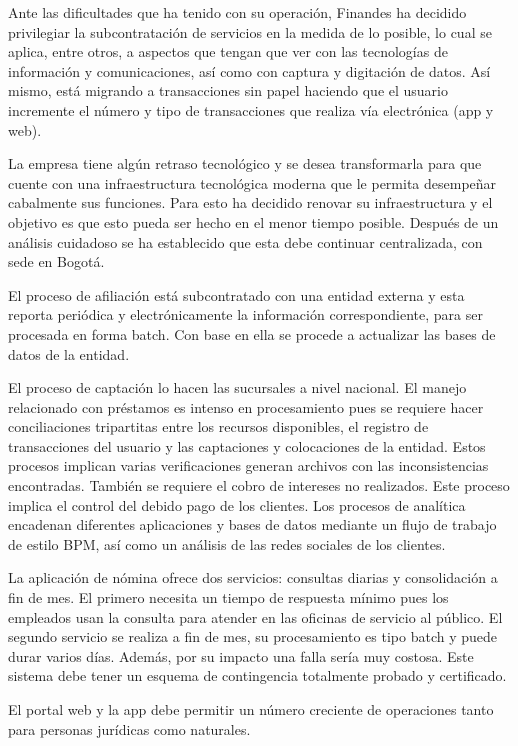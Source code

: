 \documentclass[a4paper]{article}
\begin{document}
Ante las dificultades que ha tenido con su operación, Finandes ha decidido privilegiar la subcontratación de servicios
en la medida de lo posible, lo cual se aplica, entre otros, a aspectos que tengan que ver con las tecnologías de
información y comunicaciones, así como con captura y digitación de datos. Así mismo, está migrando a
transacciones sin papel haciendo que el usuario incremente el número y tipo de transacciones que realiza vía
electrónica (app y web).

La empresa tiene algún retraso tecnológico y se desea transformarla para que cuente con una infraestructura
tecnológica moderna que le permita desempeñar cabalmente sus funciones. Para esto ha decidido renovar su
infraestructura y el objetivo es que esto pueda ser hecho en el menor tiempo posible. Después de un análisis
cuidadoso se ha establecido que esta debe continuar centralizada, con sede en Bogotá.

El proceso de afiliación está subcontratado con una entidad externa y esta reporta periódica y electrónicamente la
información correspondiente, para ser procesada en forma batch. Con base en ella se procede a actualizar las bases
de datos de la entidad.

El proceso de captación lo hacen las sucursales a nivel nacional. El manejo relacionado con préstamos es intenso en
procesamiento pues se requiere hacer conciliaciones tripartitas entre los recursos disponibles, el registro de
transacciones del usuario y las captaciones y colocaciones de la entidad. Estos procesos implican varias verificaciones generan archivos con las inconsistencias encontradas. También se requiere el cobro de intereses no
realizados. Este proceso implica el control del debido pago de los clientes.
Los procesos de analítica encadenan diferentes aplicaciones y bases de datos mediante un flujo de trabajo de estilo
BPM, así como un análisis de las redes sociales de los clientes.

La aplicación de nómina ofrece dos servicios: consultas diarias y consolidación a fin de mes. El primero necesita un
tiempo de respuesta mínimo pues los empleados usan la consulta para atender en las oficinas de servicio al público.
El segundo servicio se realiza a fin de mes, su procesamiento es tipo batch y puede durar varios días. Además, por
su impacto una falla sería muy costosa. Este sistema debe tener un esquema de contingencia totalmente probado
y certificado.

El portal web y la app debe permitir un número creciente de operaciones tanto para personas jurídicas como
naturales.
\end{document}
